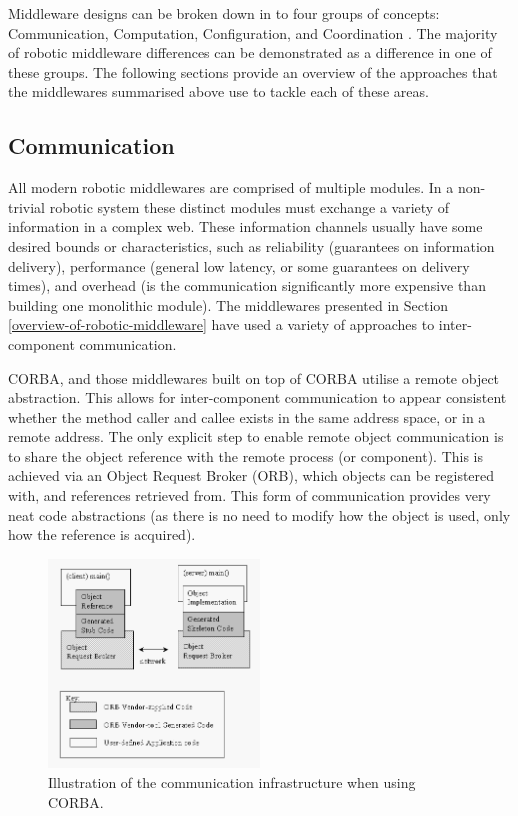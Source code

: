 \documentclass[../dissertation.tex]{subfiles}
\begin{document}

Middleware designs can be broken down in to four groups of concepts: Communication, Computation, Configuration, and Coordination \cite{brugali2010component}. The majority of robotic middleware differences can be demonstrated as a difference in one of these groups. The following sections provide an overview of the approaches that the middlewares summarised above use to tackle each of these areas.

\subsection{Communication}
\label{communication-section}

All modern robotic middlewares are comprised of multiple modules. In a non-trivial robotic system these distinct modules must exchange a variety of information in a complex web. These information channels usually have some desired bounds or characteristics, such as reliability (guarantees on information delivery), performance (general low latency, or some guarantees on delivery times), and overhead (is the communication significantly more expensive than building one monolithic module). The middlewares presented in Section \ref{overview-of-robotic-middleware} have used a variety of approaches to inter-component communication.

CORBA, and those middlewares built on top of CORBA utilise a remote object abstraction. This allows for inter-component communication to appear consistent whether the method caller and callee exists in the same address space, or in a remote address. The only explicit step to enable remote object communication is to share the object reference with the remote process (or component). This is achieved via an Object Request Broker (ORB), which objects can be registered with, and references retrieved from. This form of communication provides very neat code abstractions (as there is no need to modify how the object is used, only how the reference is acquired).

\begin{figure}[H]
\centering
\includegraphics[width=0.5\textwidth]{images/background/Orb.png}
\caption{Illustration of the communication infrastructure when using CORBA\cite{corbaCommunicationWikipediaImage}.}
\end{figure}
\end{document}

